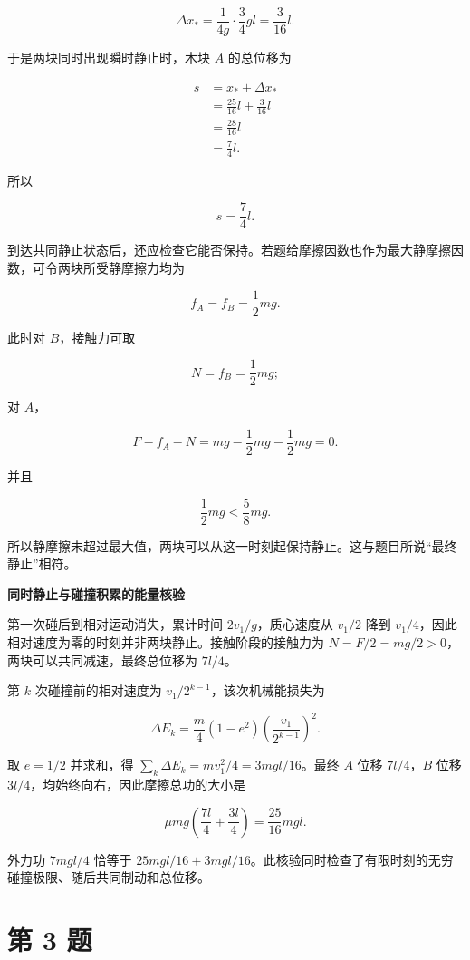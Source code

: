 \documentclass[12pt,a4paper,UTF8]{ctexart}
\begin{document}
\[\Delta x_*=
\frac{1}{4g}\cdot\frac34gl
=\frac3{16}l.\]

于是两块同时出现瞬时静止时，木块 \(A\) 的总位移为

\[\begin{aligned}
s
&=x_*+\Delta x_*\\
&=\frac{25}{16}l+\frac3{16}l\\
&=\frac{28}{16}l\\
&=\frac74l.
\end{aligned}\]

所以

\[\boxed{s=\frac74l}.\]

到达共同静止状态后，还应检查它能否保持。若题给摩擦因数也作为最大静摩擦因数，可令两块所受静摩擦力均为

\[f_A=f_B=\frac12mg.\]

此时对 \(B\)，接触力可取

\[N=f_B=\frac12mg;\]

对 \(A\)，

\[F-f_A-N
=mg-\frac12mg-\frac12mg=0.\]

并且

\[\frac12mg<\frac58mg.\]

所以静摩擦未超过最大值，两块可以从这一时刻起保持静止。这与题目所说``最终静止''相符。

\textbf{同时静止与碰撞积累的能量核验}

第一次碰后到相对运动消失，累计时间 \(2v_1/g\)，质心速度从 \(v_1/2\) 降到
\(v_1/4\)，因此相对速度为零的时刻并非两块静止。接触阶段的接触力为
\(N=F/2=mg/2>0\)，两块可以共同减速，最终总位移为 \(7l/4\)。

第 \(k\) 次碰撞前的相对速度为 \(v_1/2^{k-1}\)，该次机械能损失为

\[\Delta E_k=\frac m4(1-e^2)\left(\frac{v_1}{2^{k-1}}\right)^2.\]

取 \(e=1/2\) 并求和，得 \(\sum_k\Delta E_k=mv_1^2/4=3mgl/16\)。最终
\(A\) 位移 \(7l/4\)，\(B\) 位移
\(3l/4\)，均始终向右，因此摩擦总功的大小是

\[\mu mg\left(\frac{7l}4+\frac{3l}4\right)=\frac{25}{16}mgl.\]

外力功 \(7mgl/4\) 恰等于
\(25mgl/16+3mgl/16\)。此核验同时检查了有限时刻的无穷碰撞极限、随后共同制动和总位移。

\newpage

\section{第 3 题}\label{ux7b2c-3-ux9898}
\end{document}
